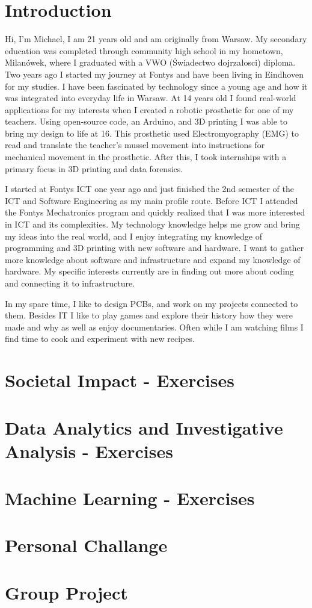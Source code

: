 \documentclass[a4paper, 11pt]{article}
\begin{document}
\section{Introduction}
Hi, I'm Michael, I am 21 years old and am originally from Warsaw. My secondary education was
completed through community high school in my hometown, Milanówek, where I graduated with a VWO
(Świadectwo dojrzałosci) diploma. Two years ago I started my journey at Fontys and have been living in
Eindhoven for my studies. I have been fascinated by technology since a young age and how it was
integrated into everyday life in Warsaw. At 14 years old I found real-world applications for my interests
when I created a robotic prosthetic for one of my teachers. Using open-source code, an Arduino, and 3D
printing I was able to bring my design to life at 16. This prosthetic used Electromyography (EMG) to read
and translate the teacher's mussel movement into instructions for mechanical movement in the
prosthetic. After this, I took internships with a primary focus in 3D printing and data forensics. \par 
\medbreak
I started at Fontys ICT one year ago and just finished the 2nd semester of the ICT and Software Engineering
as my main profile route. Before ICT I attended the Fontys Mechatronics program and quickly realized
that I was more interested in ICT and its complexities. My technology knowledge helps me grow and
bring my ideas into the real world, and I enjoy integrating my knowledge of programming and 3D
printing with new software and hardware. I want to gather more knowledge about software and
infrastructure and expand my knowledge of hardware. My specific interests currently are in finding out
more about coding and connecting it to infrastructure. \par
\medbreak
In my spare time, I like to design PCBs, and work on my projects connected to them. Besides IT I like to
play games and explore their history how they were made and why as well as enjoy documentaries.
Often while I am watching films I find time to cook and experiment with new recipes.
\section{Societal Impact - Exercises}
\section{Data Analytics and Investigative Analysis - Exercises}
\section{Machine Learning - Exercises}
\section{Personal Challange}
\section{Group Project}
\end{document}
